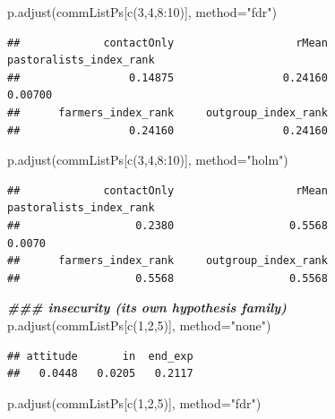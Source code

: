 \documentclass[
]{article}
\newenvironment{Shaded}{\begin{snugshade}}{\end{snugshade}}
\newcommand{\AttributeTok}[1]{\textcolor[rgb]{0.77,0.63,0.00}{#1}}
\newcommand{\DecValTok}[1]{\textcolor[rgb]{0.00,0.00,0.81}{#1}}
\newcommand{\DocumentationTok}[1]{\textcolor[rgb]{0.56,0.35,0.01}{\textbf{\textit{#1}}}}
\newcommand{\FunctionTok}[1]{\textcolor[rgb]{0.00,0.00,0.00}{#1}}
\newcommand{\NormalTok}[1]{#1}
\newcommand{\SpecialCharTok}[1]{\textcolor[rgb]{0.00,0.00,0.00}{#1}}
\newcommand{\StringTok}[1]{\textcolor[rgb]{0.31,0.60,0.02}{#1}}
\begin{document}
\begin{Shaded}
\begin{Highlighting}[]
\FunctionTok{p.adjust}\NormalTok{(commListPs[}\FunctionTok{c}\NormalTok{(}\DecValTok{3}\NormalTok{,}\DecValTok{4}\NormalTok{,}\DecValTok{8}\SpecialCharTok{:}\DecValTok{10}\NormalTok{)], }\AttributeTok{method=}\StringTok{"fdr"}\NormalTok{)}
\end{Highlighting}
\end{Shaded}

\begin{verbatim}
##             contactOnly                   rMean pastoralists_index_rank 
##                 0.14875                 0.24160                 0.00700 
##      farmers_index_rank     outgroup_index_rank 
##                 0.24160                 0.24160
\end{verbatim}

\begin{Shaded}
\begin{Highlighting}[]
\FunctionTok{p.adjust}\NormalTok{(commListPs[}\FunctionTok{c}\NormalTok{(}\DecValTok{3}\NormalTok{,}\DecValTok{4}\NormalTok{,}\DecValTok{8}\SpecialCharTok{:}\DecValTok{10}\NormalTok{)], }\AttributeTok{method=}\StringTok{"holm"}\NormalTok{)}
\end{Highlighting}
\end{Shaded}

\begin{verbatim}
##             contactOnly                   rMean pastoralists_index_rank 
##                  0.2380                  0.5568                  0.0070 
##      farmers_index_rank     outgroup_index_rank 
##                  0.5568                  0.5568
\end{verbatim}

\begin{Shaded}
\begin{Highlighting}[]
\DocumentationTok{\#\#\# insecurity (its own hypothesis family)}
\FunctionTok{p.adjust}\NormalTok{(commListPs[}\FunctionTok{c}\NormalTok{(}\DecValTok{1}\NormalTok{,}\DecValTok{2}\NormalTok{,}\DecValTok{5}\NormalTok{)], }\AttributeTok{method=}\StringTok{"none"}\NormalTok{)}
\end{Highlighting}
\end{Shaded}

\begin{verbatim}
## attitude       in  end_exp 
##   0.0448   0.0205   0.2117
\end{verbatim}

\begin{Shaded}
\begin{Highlighting}[]
\FunctionTok{p.adjust}\NormalTok{(commListPs[}\FunctionTok{c}\NormalTok{(}\DecValTok{1}\NormalTok{,}\DecValTok{2}\NormalTok{,}\DecValTok{5}\NormalTok{)], }\AttributeTok{method=}\StringTok{"fdr"}\NormalTok{)}
\end{Highlighting}
\end{Shaded}
\end{document}
